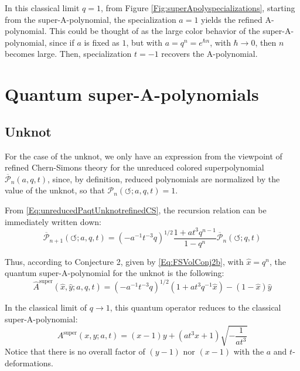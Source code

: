 \documentclass[a4paper,titlepage,twoside]{book}
\begin{document}
In this classical limit $q=1$, from Figure \ref{Fig:superApolyspecializations}, starting from the super-A-polynomial, the specialization $a=1$  yields the refined A-polynomial.  This could be thought of as the large color behavior of the super-A-polynomial, since if $a$ is fixed as $1$, but with $a=q^n = e^{\hbar n}$, with $\hbar \to 0$, then $n$ becomes large.  Then, specialization $t=-1$ recovers the A-polynomial.  %


\section{Quantum super-A-polynomials }

\subsection{Unknot}

For the case of the unknot, we only have an expression from the viewpoint of refined Chern-Simons theory for the unreduced colored superpolynomial $\overline{\mathcal{P}}_n{ (a,q,t)}$, since, by definition, reduced polynomials are normalized by the value of the unknot, so that $\mathcal{P}_n{ (\circlearrowleft; a,q,t)} =1$.  


From \eqref{Eq:unreducedPaqtUnknotrefinedCS}, the recursion relation can be immediately written down:
\begin{equation}
\overline{\mathcal{P}}_{n+1}{ (\circlearrowleft; a,q,t) } = (-a^{-1} t^{-3} q)^{1/2} \frac{ 1 + at^3 q^{n-1}}{ 1-q^n } \overline{\mathcal{P}}_n{ (\circlearrowleft; q,t ) }
\end{equation}

Thus, according to Conjecture 2, given by \eqref{Eq:FSVolConj2b}, with $\widehat{x}=q^n$, the quantum super-A-polynomial for the unknot is the following:
\begin{equation}
  \widehat{A}^{\text{super}}{ (\widehat{x}, \widehat{y}; a,q,t) } = (-a^{-1} t^{-3} q)^{1/2} ( 1 + at^3 q^{-1}\widehat{x}) - (1-\widehat{x}) \widehat{y}
\end{equation}

In the classical limit of $q\to 1$, this quantum operator reduces to the classical super-A-polynomial:
\begin{equation}
A^{\text{super}}{ (x,y;a,t) } = {\left(x - 1\right)} y + {\left(a t^{3} x + 1\right)} \sqrt{-\frac{1}{a t^{3}}} \label{Eq:unknotsuperAp}
\end{equation}
Notice that there is no overall factor of $(y-1)$ nor $(x-1)$ with the $a$ and $t$-deformations.  
\end{document}
